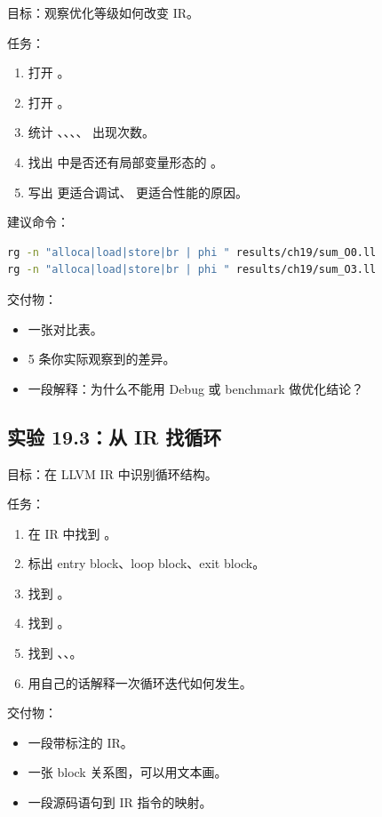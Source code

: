 \begin{labbox}
目标：观察优化等级如何改变 IR。

任务：

\begin{enumerate}
  \item 打开 。
  \item 打开 。
  \item 统计 、、、、 出现次数。
  \item 找出  中是否还有局部变量形态的 。
  \item 写出  更适合调试、 更适合性能的原因。
\end{enumerate}

建议命令：

\begin{lstlisting}[language=bash]
rg -n "alloca|load|store|br | phi " results/ch19/sum_O0.ll
rg -n "alloca|load|store|br | phi " results/ch19/sum_O3.ll
\end{lstlisting}

交付物：

\begin{itemize}
  \item 一张对比表。
  \item 5 条你实际观察到的差异。
  \item 一段解释：为什么不能用 Debug 或  benchmark 做优化结论？
\end{itemize}
\end{labbox}

\subsection{实验 19.3：从 IR 找循环}

\begin{labbox}
目标：在 LLVM IR 中识别循环结构。

任务：

\begin{enumerate}
  \item 在  IR 中找到 。
  \item 标出 entry block、loop block、exit block。
  \item 找到 。
  \item 找到 。
  \item 找到 、、。
  \item 用自己的话解释一次循环迭代如何发生。
\end{enumerate}

交付物：

\begin{itemize}
  \item 一段带标注的 IR。
  \item 一张 block 关系图，可以用文本画。
  \item 一段源码语句到 IR 指令的映射。
\end{itemize}
\end{labbox}

